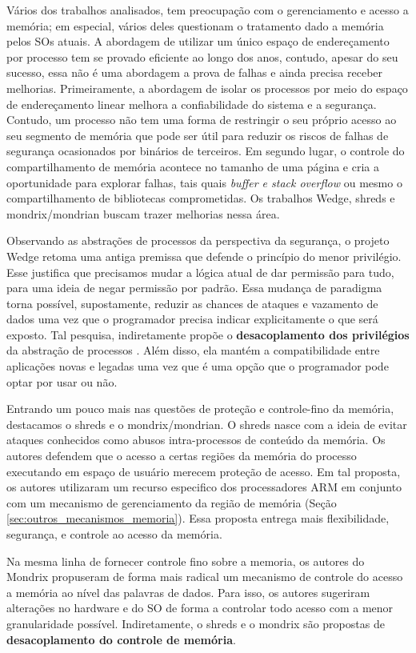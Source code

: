 Vários dos trabalhos analisados, tem preocupação com o gerenciamento e acesso a
memória; em especial, vários deles questionam o tratamento dado a memória pelos
SOs atuais.  A abordagem de utilizar um único espaço de endereçamento por
processo tem se provado eficiente ao longo dos anos, contudo, apesar do seu
sucesso, essa não é uma abordagem a prova de falhas e ainda precisa receber
melhorias.  Primeiramente, a abordagem de isolar os processos por meio do
espaço de endereçamento linear melhora a confiabilidade do sistema e a
segurança.  Contudo, um processo não tem uma forma de restringir o seu próprio
acesso ao seu segmento de memória que pode ser útil para reduzir os riscos de
falhas de segurança ocasionados por binários de terceiros. Em segundo lugar, o
controle do compartilhamento de memória acontece no tamanho de uma página e
cria a oportunidade para explorar falhas, tais quais \emph{buffer e stack
overflow} ou mesmo o compartilhamento de bibliotecas comprometidas. Os
trabalhos Wedge, shreds e mondrix/mondrian buscam trazer melhorias nessa área.

Observando as abstrações de processos da perspectiva da segurança, o projeto
Wedge retoma uma antiga premissa que defende o princípio do menor privilégio.
Esse justifica que precisamos mudar a lógica atual de dar permissão para tudo,
para uma ideia de negar permissão por padrão. Essa mudança de paradigma torna
possível, supostamente, reduzir as chances de ataques e vazamento de dados uma
vez que o programador precisa indicar explicitamente o que será exposto. Tal
pesquisa, indiretamente propõe o \textbf{desacoplamento dos privilégios} da
abstração de processos . Além disso, ela mantém a compatibilidade entre
aplicações novas e legadas uma vez que é uma opção que o programador pode optar
por usar ou não.

Entrando um pouco mais nas questões de proteção e controle-fino da memória,
destacamos o shreds e o mondrix/mondrian. O shreds nasce com a ideia de evitar
ataques conhecidos como abusos intra-processos de conteúdo da memória.  Os
autores defendem que o acesso a certas regiões da memória do processo
executando em espaço de usuário merecem proteção de acesso. Em tal proposta, os
autores utilizaram um recurso especifico dos processadores ARM em conjunto com
um mecanismo de gerenciamento da região de memória (Seção
\ref{sec:outros_mecanismos_memoria}). Essa proposta entrega mais flexibilidade,
segurança, e controle ao acesso da memória.

Na mesma linha de fornecer controle fino sobre a memoria, os autores do Mondrix
propuseram de forma mais radical um mecanismo de controle do acesso a memória
ao nível das palavras de dados. Para isso, os autores sugeriram alterações no
hardware e do SO de forma a controlar todo acesso com a menor granularidade
possível. Indiretamente, o shreds e o mondrix são propostas de
\textbf{desacoplamento do controle de memória}.

